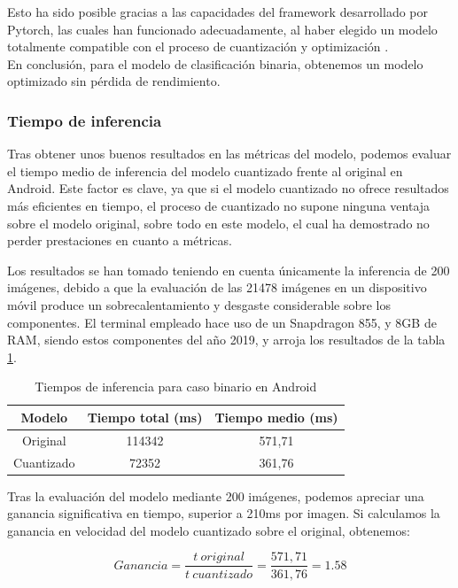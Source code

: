 Esto ha sido posible gracias a las capacidades del framework desarrollado por Pytorch, las cuales han funcionado adecuadamente, al haber elegido un modelo totalmente compatible con el proceso de cuantización y optimización \cite{comptquant}.\\

En conclusión, para el modelo de clasificación binaria, obtenemos un modelo optimizado sin pérdida de rendimiento.

\subsubsection{Tiempo de inferencia}

Tras obtener unos buenos resultados en las métricas del modelo, podemos evaluar el tiempo medio de inferencia del modelo cuantizado frente al original en Android. Este factor es clave, ya que si el modelo cuantizado no ofrece resultados más eficientes en tiempo, el proceso de cuantizado no supone ninguna ventaja sobre el modelo original, sobre todo en este modelo, el cual ha demostrado no perder prestaciones en cuanto a métricas.

Los resultados se han tomado teniendo en cuenta únicamente la inferencia de 200 imágenes, debido a que la evaluación de las 21478 imágenes en un dispositivo móvil produce un sobrecalentamiento y desgaste considerable sobre los componentes. El terminal empleado hace uso de un Snapdragon 855, y 8GB de RAM, siendo estos componentes del año 2019, y arroja los resultados de la tabla \ref{infbintmp}.

\begin{table}[H]
	\centering
	\begin{tabular}{|c|c|c|}
		\hline
		Modelo & Tiempo total (ms) & Tiempo medio (ms) \\ \hline
		Original & 114342 & 571,71 \\ \hline
		Cuantizado & 72352 & 361,76 \\ \hline
	\end{tabular}
	\caption{Tiempos de inferencia para caso binario en Android}
	\label{infbintmp}
\end{table}

Tras la evaluación del modelo mediante 200 imágenes, podemos apreciar una ganancia significativa en tiempo, superior a 210ms por imagen. Si calculamos la ganancia en velocidad del modelo cuantizado sobre el original, obtenemos:

$$Ganancia = \frac{t\ original}{t\ cuantizado} = \frac{571,71}{361,76} = 1.58$$

